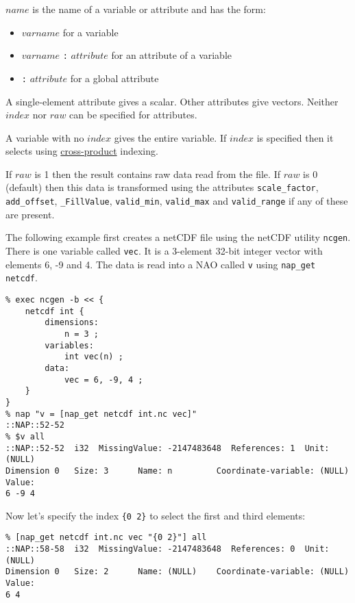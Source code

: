   $name$ is the name of a variable or attribute and has the
  form:
  \begin{itemize}
    \item 
    $varname$ for a variable
    \item 
    $varname$
    \texttt{:}
    $attribute$ for an attribute of a variable
    \item 
    \texttt{:}
    $attribute$ for a global attribute
    \\
  \end{itemize}
  

A single-element attribute gives a scalar. Other attributes give
  vectors. Neither 
  $index$ nor 
  $raw$ can be specified for attributes.
  

A variable with no 
  $index$ gives the entire variable. If 
  $index$ is specified then it selects using 
  \href{indexing.html\#Cross-product-index}{cross-product}
  indexing.
  

If 
  $raw$ is 1 then the result contains raw data read from the
  file. If 
  $raw$ is 0 (default) then this data is transformed using the
  attributes 
  \texttt{scale\_factor}, 
  \texttt{add\_offset}, 
  \texttt{\_FillValue}, 
  \texttt{valid\_min}, 
  \texttt{valid\_max} and 
  \texttt{valid\_range} if any of these are present.
  

The following example first creates a netCDF file using the netCDF
  utility 
  \texttt{ncgen}. There is one variable called 
  \texttt{vec}. It is a 3-element 32-bit integer vector with
  elements 6, -9 and 4. The data is read into a NAO called 
  \texttt{v} using 
  \texttt{nap\_get netcdf}.
  \begin{verbatim}
% exec ncgen -b << {
    netcdf int {
        dimensions:
            n = 3 ;
        variables:
            int vec(n) ;
        data:
            vec = 6, -9, 4 ;
    }
}
% nap "v = [nap_get netcdf int.nc vec]"
::NAP::52-52
% $v all
::NAP::52-52  i32  MissingValue: -2147483648  References: 1  Unit:
(NULL)
Dimension 0   Size: 3      Name: n         Coordinate-variable: (NULL)
Value:
6 -9 4
\end{verbatim}

  

Now let's specify the index 
  \texttt{\{0 2\}} to select the first and third elements:
  \begin{verbatim}
% [nap_get netcdf int.nc vec "{0 2}"] all
::NAP::58-58  i32  MissingValue: -2147483648  References: 0  Unit:
(NULL)
Dimension 0   Size: 2      Name: (NULL)    Coordinate-variable: (NULL)
Value:
6 4
\end{verbatim}

